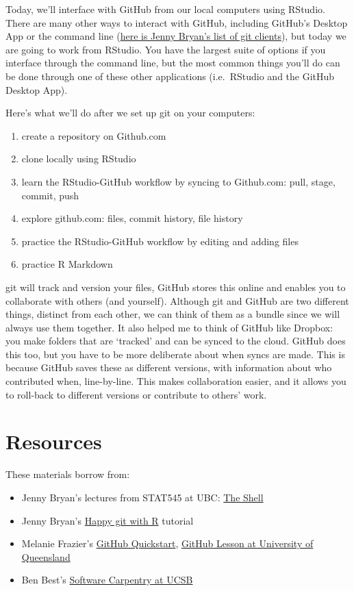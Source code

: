 \documentclass[]{book}
\providecommand{\tightlist}{%
  \setlength{\itemsep}{0pt}\setlength{\parskip}{0pt}}
\begin{document}
Today, we'll interface with GitHub from our local computers using RStudio. There are many other ways to interact with GitHub, including GitHub's Desktop App or the command line (\href{http://stat545.com/git02_git-clients.html}{here is Jenny Bryan's list of git clients}), but today we are going to work from RStudio. You have the largest suite of options if you interface through the command line, but the most common things you'll do can be done through one of these other applications (i.e.~RStudio and the GitHub Desktop App).

Here's what we'll do after we set up git on your computers:

\begin{enumerate}
\def\labelenumi{\arabic{enumi}.}
\tightlist
\item
  create a repository on Github.com
\item
  clone locally using RStudio
\item
  learn the RStudio-GitHub workflow by syncing to Github.com: pull, stage, commit, push
\item
  explore github.com: files, commit history, file history
\item
  practice the RStudio-GitHub workflow by editing and adding files
\item
  practice R Markdown
\end{enumerate}

git will track and version your files, GitHub stores this online and enables you to collaborate with others (and yourself). Although git and GitHub are two different things, distinct from each other, we can think of them as a bundle since we will always use them together. It also helped me to think of GitHub like Dropbox: you make folders that are `tracked' and can be synced to the cloud. GitHub does this too, but you have to be more deliberate about when syncs are made. This is because GitHub saves these as different versions, with information about who contributed when, line-by-line. This makes collaboration easier, and it allows you to roll-back to different versions or contribute to others' work.

\hypertarget{resources-2}{%
\section{Resources}\label{resources-2}}

These materials borrow from:

\begin{itemize}
\tightlist
\item
  Jenny Bryan's lectures from STAT545 at UBC: \href{http://stat545.com/git09_shell.html}{The Shell}
\item
  Jenny Bryan's \href{http://happygitwithr.com}{Happy git with R} tutorial
\item
  Melanie Frazier's \href{https://rawgit.com/nazrug/Quickstart/master/GithubQuickstart.html}{GitHub Quickstart}, \href{https://github.com/OHI-Science/data-science-training/blob/master/github_mel.Rmd}{GitHub Lesson at University of Queensland}
\item
  Ben Best's \href{http://remi-daigle.github.io/2016-04-15-UCSB/git/}{Software Carpentry at UCSB}
\end{itemize}
\end{document}
